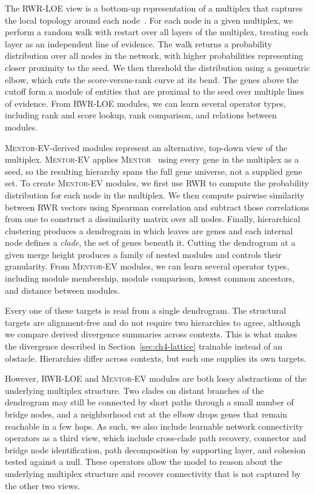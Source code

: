 \documentclass[thesis,letterpaper,12pt]{utthesis}
\begin{document}
The RWR-LOE view is a bottom-up representation of a multiplex that captures the local topology around each node~\cite{kainer2025rwrtoolkit}. For each node in a given multiplex, we perform a random walk with restart over all layers of the multiplex, treating each layer as an independent line of evidence. The walk returns a probability distribution over all nodes in the network, with higher probabilities representing closer proximity to the seed. We then threshold the distribution using a geometric elbow, which cuts the score-versus-rank curve at its bend. The genes above the cutoff form a module of entities that are proximal to the seed over multiple lines of evidence. From RWR-LOE modules, we can learn several operator types, including rank and score lookup, rank comparison, and relations between modules.

\textsc{Mentor-EV}-derived modules represent an alternative, top-down view of the multiplex. \textsc{Mentor-EV} applies \textsc{Mentor}~\cite{mentor} using every gene in the multiplex as a seed, so the resulting hierarchy spans the full gene universe, not a supplied gene set. To create \textsc{Mentor-EV} modules, we first use RWR to compute the probability distribution for each node in the multiplex. We then compute pairwise similarity between RWR vectors using Spearman correlation and subtract those correlations from one to construct a dissimilarity matrix over all nodes. Finally, hierarchical clustering produces a dendrogram in which leaves are genes and each internal node defines a \textit{clade}, the set of genes beneath it. Cutting the dendrogram at a given merge height produces a family of nested modules and controls their granularity. From \textsc{Mentor-EV} modules, we can learn several operator types, including module membership, module comparison, lowest common ancestors, and distance between modules.

Every one of these targets is read from a single dendrogram. The structural targets are alignment-free and do not require two hierarchies to agree, although we compare derived divergence summaries across contexts. This is what makes the divergence described in Section~\ref{sec:ch4-lattice} trainable instead of an obstacle. Hierarchies differ across contexts, but each one supplies its own targets.

However, RWR-LOE and \textsc{Mentor-EV} modules are both lossy abstractions of the underlying multiplex structure. Two clades on distant branches of the dendrogram may still be connected by short paths through a small number of bridge nodes, and a neighborhood cut at the elbow drops genes that remain reachable in a few hops. As such, we also include learnable network connectivity operators as a third view, which include cross-clade path recovery, connector and bridge node identification, path decomposition by supporting layer, and cohesion tested against a null. These operators allow the model to reason about the underlying multiplex structure and recover connectivity that is not captured by the other two views.
\end{document}

